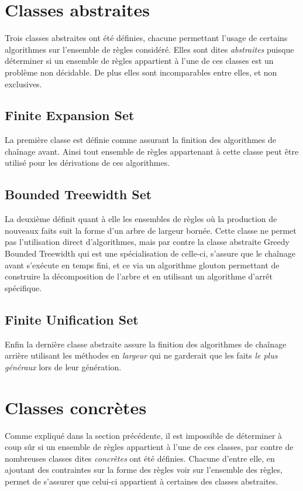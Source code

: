 
\section{Classes abstraites}\label{classes_abstraites}
Trois classes abstraites ont été définies, chacune permettant l'usage de certains
algorithmes sur l'ensemble de règles considéré.
Elles sont dites {\em abstraites} puisque déterminer si un ensemble de règles appartient
à l'une de ces classes est un problème non décidable.
De plus elles sont incomparables entre elles, et non exclusives. 

\subsection{Finite Expansion Set}\label{classes_abstraites_fus}
La première classe est définie comme assurant la finition des algorithmes de chaînage
avant. Ainsi tout ensemble de règles appartenant à cette classe peut être utilisé pour
les dérivations de ces algorithmes.

\subsection{Bounded Treewidth Set}\label{classes_abstraites_bts}
La deuxième définit quant à elle 
les ensembles de règles où la production de nouveaux faits suit la
forme d'un arbre de largeur bornée.
Cette classe ne permet pas l'utilisation direct d'algorithmes, mais par contre la classe
abstraite Greedy Bounded Treewidth qui est une spécialisation de celle-ci, s'assure que
le chaînage avant s'exécute en temps fini, et ce via un algorithme glouton permettant de
construire la décomposition de l'arbre et en utilisant un algorithme d'arrêt spécifique.

\subsection{Finite Unification Set}\label{classes_abstraites_fes}
Enfin la dernière classe abstraite assure la finition des algorithmes de chaînage
arrière utilisant les méthodes en {\em largeur} qui ne garderait que les faits {\em le plus
généraux} lors de leur génération.


\section{Classes concrètes}\label{classes_concretes}
Comme expliqué dans la section précédente, il est impossible de déterminer à coup sûr 
si un ensemble
de règles appartient à l'une de ces classes, par contre de nombreuses classes dites
{\em concrètes }
ont été définies. Chacune d'entre elle, en ajoutant des contraintes sur la forme des
règles voir sur l'ensemble des règles, 
permet de s'assurer que celui-ci appartient à certaines des classes
abstraites.

